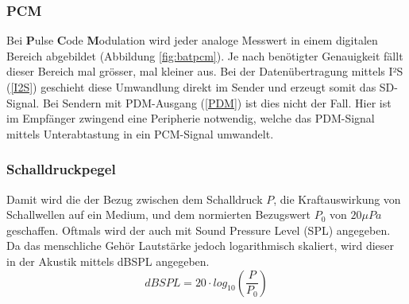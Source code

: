 \documentclass[12pt]{article}
\begin{document}
	\subsubsection*{PCM}
	Bei \textbf{P}ulse \textbf{C}ode \textbf{M}odulation wird jeder analoge Messwert in einem digitalen Bereich abgebildet (Abbildung \ref{fig:batpcm}). Je nach benötigter Genauigkeit fällt dieser Bereich mal grösser, mal kleiner aus. Bei der Datenübertragung mittels I²S (\ref{I2S}) geschieht diese Umwandlung direkt im Sender und erzeugt somit das SD-Signal. Bei Sendern mit PDM-Ausgang (\ref{PDM}) ist dies nicht der Fall. Hier ist im Empfänger zwingend eine Peripherie notwendig, welche das PDM-Signal mittels Unterabtastung in ein PCM-Signal umwandelt.
	\subsubsection*{Schalldruckpegel}
	Damit wird die der Bezug zwischen dem Schalldruck \textbf{$P$}, die Kraftauswirkung von Schallwellen auf ein Medium, und dem normierten Bezugswert \textbf{$P_0$} von $20 \mu Pa$ geschaffen. Oftmals wird der auch mit Sound Pressure Level (SPL) angegeben. Da das menschliche Gehör Lautstärke jedoch logarithmisch skaliert, wird dieser in der Akustik mittels dBSPL angegeben.
		\begin{equation}\label{dBSPL}
		dBSPL = 20 \cdot log_{10}(\frac{P}{P_0})
	\end{equation}
\end{document}
